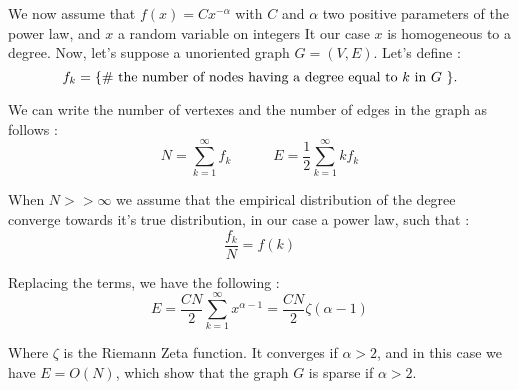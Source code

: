 \documentclass[a4paper, 12pt]{article}
\begin{document}
We now assume that $f(x) = C x^{- \alpha}$ with $C$ and $\alpha$ two positive parameters of the power law, and $x$ a random variable on integers It our case $x$ is homogeneous to a degree. Now, let's suppose a unoriented graph $G=(V,E)$. Let's define : 
\begin{equation}
    f_k =  \textnormal{\{\# the number of nodes  having a degree equal to $k$ in $G$ \}}.
\end{equation}

We can write the number of vertexes and the number of edges in the graph as follows :
\begin{equation}
    N = \sum_{k=1}^\infty f_k  \quad\qquad E = \frac{1}{2}\sum_{k=1}^\infty k f_k 
\end{equation}

When $N >> \infty$ we assume that the empirical distribution of the degree converge towards it's true distribution, in our case a power law, such that :
\begin{equation}
    \frac{f_k}{N} = f(k)
\end{equation}

Replacing the terms, we have the following :
\begin{equation} \label{eq:e_zeta}
    E = \frac{CN}{2}\sum_{k=1}^\infty x^{\alpha-1} = \frac{CN}{2} \zeta(\alpha-1)
\end{equation}

Where $\zeta$ is the Riemann Zeta function. It converges if $\alpha > 2$, and in this case we have $E = O(N)$, which show that the graph $G$ is sparse if $\alpha > 2$.



\end{document}
